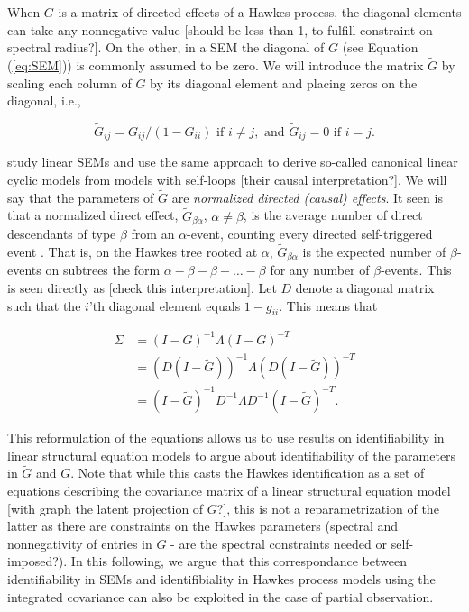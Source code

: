 \documentclass[accepted]{uai2021} %
\begin{document}
When $G$ is a matrix of directed effects of a Hawkes process, the diagonal 
elements can take any nonnegative value [should be less than 1, to fulfill 
constraint on spectral radius?]. On the other, in a SEM the diagonal of $G$ 
(see Equation (\ref{eq:SEM})) is commonly assumed to be zero. We will introduce 
the matrix $\tilde{G}$ by scaling each column of $G$ by its 
diagonal element and placing zeros on the diagonal, i.e.,

$$
\tilde{G}_{ij} = G_{ij}/(1-G_{ii})  \text{ if } i\neq j, \text{ and } 
\tilde{G}_{ij} 
= 0 \text{ if } i= j.
$$

\cite{hyttinen2012} study linear SEMs and use the same approach to derive 
so-called canonical linear 
cyclic models from models with self-loops [their causal interpretation?]. We 
will say that the parameters of $\tilde{G}$ are \emph{normalized directed 
(causal) effects}. It seen is that a normalized direct effect, 
$\tilde{G}_{\beta\alpha}$, $\alpha\neq\beta$, is the average number of direct 
descendants of type 
$\beta$ from an $\alpha$-event, counting every directed self-triggered event . 
That is, on the Hawkes tree rooted at $\alpha$, $\tilde{G}_{\beta\alpha}$ is 
the expected number of $\beta$-events on subtrees the form $\alpha - \beta - 
\beta - \ldots - 
\beta$ for any number of $\beta$-events. This is seen directly as 
[check this interpretation]. 
Let $D$ denote a 
diagonal matrix such that the $i$'th diagonal element equals 
$1 - g_{ii}$. This means that 

\begin{align*}
\Sigma & = (I - G)^{-1}\Lambda (I - G)^{-T}  \\
& = (D(I - \tilde{G}))^{-1}\Lambda (D(I - \tilde{G}))^{-T} \\
& = (I - \tilde{G})^{-1}D^{-1} \Lambda D^{-1}(I - 
\tilde{G})^{-T}.
\label{eq:Gtilde}
\end{align*}


This reformulation of the equations allows us to use results on identifiability 
in linear structural 
equation models to argue about 
identifiability of the parameters in $\tilde{G}$ and $G$. Note that while this 
casts the Hawkes identification as a set of equations describing the covariance 
matrix of a linear structural equation model [with graph the latent projection 
of $G$?], this is not a reparametrization 
of the latter as there are constraints on the Hawkes parameters (spectral 
and nonnegativity of entries in $G$ - are the spectral constraints needed or 
self-imposed?). In this following, we argue that this correspondance between 
identifiability in SEMs and identifibiality in Hawkes process models using the 
integrated covariance can also be exploited in the case of partial observation.
\end{document}
